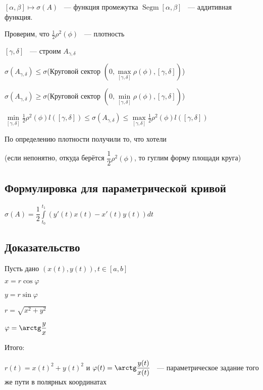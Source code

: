\documentclass[../main.tex]{subfiles}
\begin{document}
            $[\alpha, \beta] \longmapsto \sigma(A)$ ~--- функция промежутка $\operatorname{Segm} [\alpha, \beta]$ ~--- аддитивная функция.
            
            Проверим, что $\frac{1}{2} \rho^2 (\phi)$ ~--- плотность
            
            $[\gamma, \delta]$ ~--- строим $A_{\gamma{,} \delta}$
            
            $\sigma (A_{\gamma{,} \delta}) \leq \sigma$(Круговой сектор $(0, \max\limits_{[\gamma, \delta]} \rho(\phi), [\gamma, \delta])$)
            
            $\sigma (A_{\gamma{,} \delta}) \geq \sigma$(Круговой сектор $(0, \min\limits_{[\gamma, \delta]} \rho(\phi), [\gamma, \delta])$)
            
            $\min\limits_{[\gamma, \delta]} \frac{1}{2} \rho^2(\phi) l([\gamma, \delta]) \leq \sigma (A_{\gamma{,} \delta}) \leq \max\limits_{[\gamma, \delta]} \frac{1}{2} \rho^2(\phi) l([\gamma, \delta])$
            
            По определению плотности получили то, что хотели
            
            (если непонятно, откуда берётся $\dfrac{1}{2} \rho^2(\phi)$, то гуглим форму площади круга)
            
        \subsection*{Формулировка для параметрической кривой}
        
            $\sigma(A) = \dfrac{1}{2} \int\limits^{t_1}_{t_0} (y'(t) x(t) - x'(t) y(t)) dt$
            
        \subsection*{Доказательство}
        
            Пусть дано $(x(t), y(t)), t \in [a, b]$
            
            $x = r \cos {\varphi}$
            
            $y = r \sin {\varphi}$
            
            $r = \sqrt{x^2 + y^2}$
            
            $\varphi = \arctg \dfrac{y}{x}$
            
            Итого:
            
            $r(t) = x(t)^2 + y(t)^2$ и $\varphi(t) = \arctg \dfrac{y(t)}{x(t)}$ ~--- параметрическое задание того же пути в полярных координатах
            
\end{document}
